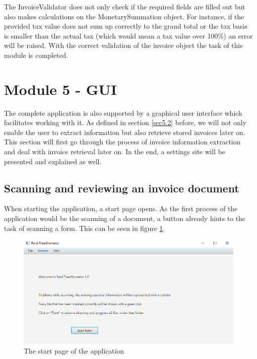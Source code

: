 The InvoiceValidator does not only check if the required fields are filled out but also makes calculations on the MonetarySummation object. For instance, if the provided tax value does not sum up correctly to the grand total or the tax basis is smaller than the actual tax (which would mean a tax value over 100\%) an error will be raised.
With the correct validation of the invoice object the task of this module is completed. 

\section{Module 5 - GUI}
\label{sec5.8}
The complete application is also supported by a graphical user interface which facilitates working with it.
As defined in section \ref{sec5.2} before, we will not only enable the user to extract information but also retrieve stored invoices later on. This section will first go through the process of invoice information extraction and deal with invoice retrieval later on. In the end, a settings site will be presented and explained as well.

\subsection{Scanning and reviewing an invoice document}
\label{sec5.8.1}

When starting the application, a start page opens. As the first process of the application would be the scanning of a document, a button already hints to the task of scanning a form. This can be seen in figure \ref{startmenu}.

\begin{figure}[ht!]
\centering
\includegraphics[scale=0.6]{Images/GUI/startmenu.png}
\caption{The start page of the application \label{startmenu}}
\end{figure}

